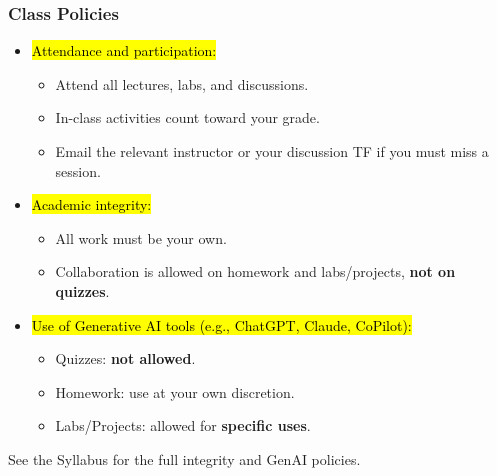 \documentclass[slidestop,compress,mathserif]{beamer}
\begin{document}
\begin{frame}
	\frametitle{Class Policies} 
	\begin{itemize}
		\item \hl{Attendance and participation:}
		\begin{itemize}
			\item Attend all lectures, labs, and discussions.
			\item In-class activities count toward your grade.
			\item Email the relevant instructor or your discussion TF if you must miss a session.
		\end{itemize}
		\item \hl{Academic integrity:}
		\begin{itemize}
			\item All work must be your own.
			\item Collaboration is allowed on homework and labs/projects, \textbf{not on quizzes}.
		\end{itemize}
		\item \hl{Use of Generative AI tools (e.g., ChatGPT, Claude, CoPilot):}
		\begin{itemize}
			\item Quizzes: \textbf{not allowed}.
			\item Homework: use at your own discretion.
			\item Labs/Projects: allowed for \textbf{specific uses}.
		\end{itemize}
	\end{itemize}

	\vspace{0.3em}
	{\footnotesize See the Syllabus for the full integrity and GenAI policies.}
\end{frame}
\end{document}
